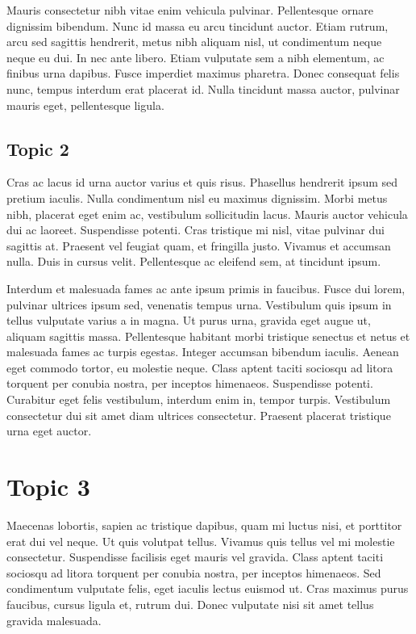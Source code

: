 \documentclass[10pt]{article}
\begin{document}
Mauris consectetur nibh vitae enim vehicula pulvinar. Pellentesque ornare dignissim bibendum. Nunc id massa eu arcu tincidunt auctor. Etiam rutrum, arcu sed sagittis hendrerit, metus nibh aliquam nisl, ut condimentum neque neque eu dui. In nec ante libero. Etiam vulputate sem a nibh elementum, ac finibus urna dapibus. Fusce imperdiet maximus pharetra. Donec consequat felis nunc, tempus interdum erat placerat id. Nulla tincidunt massa auctor, pulvinar mauris eget, pellentesque ligula.

\subsection{Topic 2}
Cras ac lacus id urna auctor varius et quis risus. Phasellus hendrerit ipsum sed pretium iaculis. Nulla condimentum nisl eu maximus dignissim. Morbi metus nibh, placerat eget enim ac, vestibulum sollicitudin lacus. Mauris auctor vehicula dui ac laoreet. Suspendisse potenti. Cras tristique mi nisl, vitae pulvinar dui sagittis at. Praesent vel feugiat quam, et fringilla justo. Vivamus et accumsan nulla. Duis in cursus velit. Pellentesque ac eleifend sem, at tincidunt ipsum.

Interdum et malesuada fames ac ante ipsum primis in faucibus. Fusce dui lorem, pulvinar ultrices ipsum sed, venenatis tempus urna. Vestibulum quis ipsum in tellus vulputate varius a in magna. Ut purus urna, gravida eget augue ut, aliquam sagittis massa. Pellentesque habitant morbi tristique senectus et netus et malesuada fames ac turpis egestas. Integer accumsan bibendum iaculis. Aenean eget commodo tortor, eu molestie neque. Class aptent taciti sociosqu ad litora torquent per conubia nostra, per inceptos himenaeos. Suspendisse potenti. Curabitur eget felis vestibulum, interdum enim in, tempor turpis. Vestibulum consectetur dui sit amet diam ultrices consectetur. Praesent placerat tristique urna eget auctor.

\section{Topic 3}
Maecenas lobortis, sapien ac tristique dapibus, quam mi luctus nisi, et porttitor erat dui vel neque. Ut quis volutpat tellus. Vivamus quis tellus vel mi molestie consectetur. Suspendisse facilisis eget mauris vel gravida. Class aptent taciti sociosqu ad litora torquent per conubia nostra, per inceptos himenaeos. Sed condimentum vulputate felis, eget iaculis lectus euismod ut. Cras maximus purus faucibus, cursus ligula et, rutrum dui. Donec vulputate nisi sit amet tellus gravida malesuada.
\end{document}
